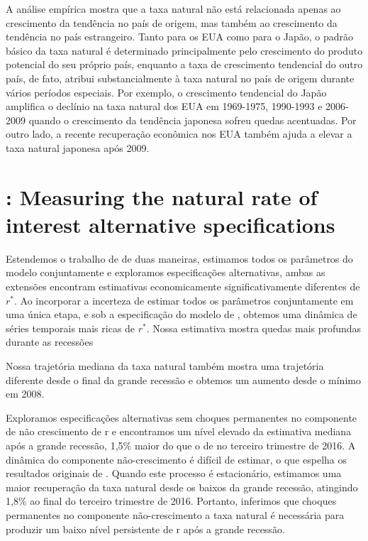 A análise empírica mostra que a taxa natural não está relacionada apenas ao crescimento da tendência no país de origem, mas também ao crescimento da tendência no país estrangeiro. Tanto para os EUA como para o Japão, o padrão básico da taxa natural é determinado principalmente pelo crescimento do produto potencial do seu próprio país, enquanto a taxa de crescimento tendencial do outro país, de fato, atribui substancialmente à taxa natural no país de origem durante vários períodos especiais. Por exemplo, o crescimento tendencial do Japão amplifica o declínio na taxa natural dos EUA em 1969-1975, 1990-1993 e 2006-2009 quando o crescimento da tendência japonesa sofreu quedas acentuadas. Por outro lado, a recente recuperação econômica nos EUA também ajuda a elevar a taxa natural japonesa após 2009.
%
%
\section{\citet{Lewis:2017}: Measuring the natural rate of interest alternative specifications }

Estendemos o trabalho de \citet{LW:2003} de duas maneiras, estimamos todos os parâmetros do modelo conjuntamente e exploramos especificações alternativas, ambas as extensões encontram estimativas economicamente significativamente diferentes de $r^*$. Ao incorporar a incerteza de estimar todos os parâmetros conjuntamente em uma única etapa, e sob a especificação do modelo de \citet{HLW:2017}, obtemos uma dinâmica de séries temporais mais ricas de $r^*$. Nossa estimativa mostra quedas mais profundas durante as recessões

Nossa trajetória mediana da taxa natural também mostra uma trajetória diferente desde o final da grande recessão e obtemos um aumento desde o mínimo em 2008.

Exploramos especificações alternativas sem choques permanentes no componente de não crescimento de r e encontramos um nível elevado da estimativa mediana após a grande recessão, 1,5$\%$ maior do que o de \citet{HLW:2017} no terceiro trimestre de 2016. A dinâmica do componente não-crescimento é difícil de estimar, o que espelha os resultados originais de \citet{LW:2003}. Quando este processo é estacionário, estimamos uma maior recuperação da taxa natural desde os baixos da grande recessão, atingindo 1,8$\%$ ao final do terceiro trimestre de 2016. Portanto, inferimos que choques permanentes no componente não-crescimento a taxa natural é necessária para produzir um baixo nível persistente de r após a grande recessão.

